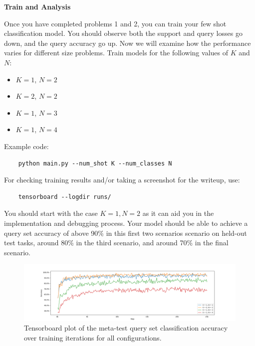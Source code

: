\item {} {\bf Train and Analysis}

Once you have completed problems 1 and 2, you can train your few shot classification model. You should observe both the support and query losses go down, and the query accuracy go up. Now we will examine how the performance varies for different size problems.
Train models for the following values of $K$ and $N$:
\begin{itemize}
    \item $K = 1$, $N=2$ %
    \item $K = 2$, $N=2$ %
    \item $K = 1$, $N=3$ %
    \item $K = 1$, $N=4$ %
\end{itemize}

Example code:
\begin{verbatim}
    python main.py --num_shot K --num_classes N
\end{verbatim}  

For checking training results and/or taking a screenshot for the writeup, use:
\begin{verbatim}
    tensorboard --logdir runs/
\end{verbatim}

You should start with the case $K=1 , N=2$ as it can aid you in the implementation and debugging process. Your model should be able to achieve a query set accuracy of above 90\% in this first two scenarios scenario on held-out test tasks, around 80\% in the third scenario, and around 70\% in the final scenario.

\begin{figure}
    \centering
    \includegraphics[width=\linewidth]{./figures/accuracy.png}
    \vspace{-5mm}
    \caption{Tensorboard plot of the meta-test query set classification accuracy over training iterations for all configurations.}
    \label{accuracy}
\end{figure}

